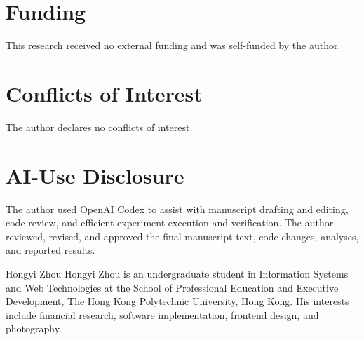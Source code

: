 \documentclass{ieeeaccess}
\begin{document}
\section*{Funding}
This research received no external funding and was self-funded by the author.

\section*{Conflicts of Interest}
The author declares no conflicts of interest.

\section*{AI-Use Disclosure}
The author used OpenAI Codex to assist with manuscript drafting and editing, code review, and efficient experiment execution and verification. The author reviewed, revised, and approved the final manuscript text, code changes, analyses, and reported results.

\clearpage




\begin{IEEEbiographynophoto}{Hongyi Zhou}
Hongyi Zhou is an undergraduate student in Information Systems and Web Technologies at the School of Professional Education and Executive Development, The Hong Kong Polytechnic University, Hong Kong. His interests include financial research, software implementation, frontend design, and photography.
\end{IEEEbiographynophoto}

\EOD
\end{document}
